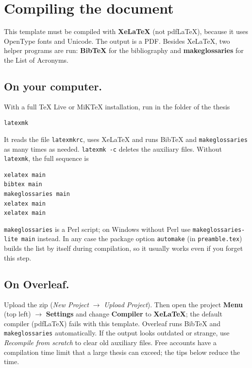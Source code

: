 \chapter{Compiling the document}\label{app:compile}


This template must be compiled with \textbf{XeLaTeX} (not pdfLaTeX), because it uses OpenType fonts and Unicode. The output is a PDF. Besides XeLaTeX, two helper programs are run: \textbf{BibTeX} for the bibliography and \textbf{makeglossaries} for the List of Acronyms.

\section{On your computer.}
With a full TeX Live or MiKTeX installation, run in the folder of the thesis
\begin{verbatim}
latexmk
\end{verbatim}
It reads the file \texttt{latexmkrc}, uses XeLaTeX and runs BibTeX and \texttt{makeglossaries} as many times as needed. \texttt{latexmk -c} deletes the auxiliary files. Without \texttt{latexmk}, the full sequence is
\begin{verbatim}
xelatex main
bibtex main
makeglossaries main
xelatex main
xelatex main
\end{verbatim}
\texttt{makeglossaries} is a Perl script; on Windows without Perl use \texttt{makeglossaries-lite main} instead. In any case the package option \texttt{automake} (in \texttt{preamble.tex}) builds the list by itself during compilation, so it usually works even if you forget this step.

\section{On Overleaf.}
Upload the zip (\emph{New Project} $\to$ \emph{Upload Project}). Then open the project \textbf{Menu} (top left) $\to$ \textbf{Settings} and change \textbf{Compiler} to \textbf{XeLaTeX}; the default compiler (pdfLaTeX) fails with this template. Overleaf runs BibTeX and \texttt{makeglossaries} automatically. If the output looks outdated or strange, use \emph{Recompile from scratch} to clear old auxiliary files. Free accounts have a compilation time limit that a large thesis can exceed; the tips below reduce the time.

